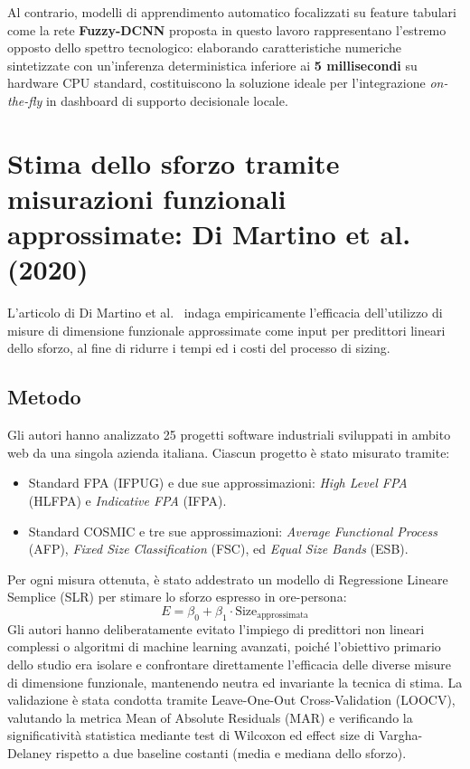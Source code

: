 \documentclass[11pt, a4paper]{article}
\begin{document}
Al contrario, modelli di apprendimento automatico focalizzati su feature tabulari come la rete \textbf{Fuzzy-DCNN} proposta in questo lavoro rappresentano l'estremo opposto dello spettro tecnologico: elaborando caratteristiche numeriche sintetizzate con un'inferenza deterministica inferiore ai \textbf{5 millisecondi} su hardware CPU standard, costituiscono la soluzione ideale per l'integrazione \textit{on-the-fly} in dashboard di supporto decisionale locale.

\section{Stima dello sforzo tramite misurazioni funzionali approssimate: Di Martino et al. (2020)}\label{sec:dimartino}
L'articolo di Di Martino et al.~\cite{DIMARTINO2020106308} indaga empiricamente l'efficacia dell'utilizzo di misure di dimensione funzionale approssimate come input per predittori lineari dello sforzo, al fine di ridurre i tempi ed i costi del processo di sizing.

\subsection{Metodo}
Gli autori hanno analizzato 25 progetti software industriali sviluppati in ambito web da una singola azienda italiana. Ciascun progetto è stato misurato tramite:
\begin{itemize}
    \item Standard FPA (IFPUG) e due sue approssimazioni: \textit{High Level FPA} (HLFPA) e \textit{Indicative FPA} (IFPA).
    \item Standard COSMIC e tre sue approssimazioni: \textit{Average Functional Process} (AFP), \textit{Fixed Size Classification} (FSC), ed \textit{Equal Size Bands} (ESB).
\end{itemize}
Per ogni misura ottenuta, è stato addestrato un modello di Regressione Lineare Semplice (SLR) per stimare lo sforzo espresso in ore-persona:
\begin{equation}
    E = \beta_0 + \beta_1 \cdot \text{Size}_{\text{approssimata}}
\end{equation}
Gli autori hanno deliberatamente evitato l'impiego di predittori non lineari complessi o algoritmi di machine learning avanzati, poiché l'obiettivo primario dello studio era isolare e confrontare direttamente l'efficacia delle diverse misure di dimensione funzionale, mantenendo neutra ed invariante la tecnica di stima. La validazione è stata condotta tramite Leave-One-Out Cross-Validation (LOOCV), valutando la metrica Mean of Absolute Residuals (MAR) e verificando la significatività statistica mediante test di Wilcoxon ed effect size di Vargha-Delaney rispetto a due baseline costanti (media e mediana dello sforzo).
\end{document}
